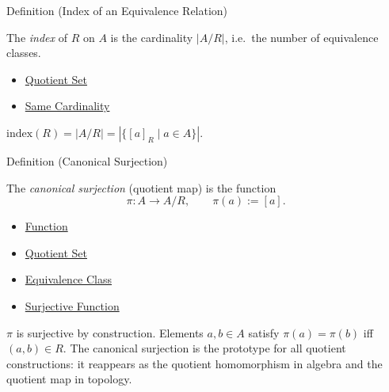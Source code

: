 \begin{definitionbox}{Definition (Index of an Equivalence Relation)}
\begin{definition}\label{def:index}
The \emph{index} of $R$ on $A$ is the cardinality $|A/R|$, i.e.\ the number
of equivalence classes.
\end{definition}
\end{definitionbox}

\begin{dependencies}
\begin{itemize}
  \item \hyperref[def:quotient-set]{Quotient Set}
  \item \hyperref[def:same-cardinality]{Same Cardinality}
\end{itemize}
\end{dependencies}

\begin{remark*}
$\mathrm{index}(R) = |A/R| = |\{[a]_R \mid a \in A\}|$.
\end{remark*}

\begin{definitionbox}{Definition (Canonical Surjection)}
\begin{definition}\label{def:canonical-surj}
The \emph{canonical surjection} (quotient map) is the function
\[
\pi : A \to A/R,
\qquad
\pi(a) := [a].
\]
\end{definition}
\end{definitionbox}

\begin{dependencies}
\begin{itemize}
  \item \hyperref[def:function]{Function}
  \item \hyperref[def:quotient-set]{Quotient Set}
  \item \hyperref[def:equiv-class]{Equivalence Class}
  \item \hyperref[def:surjective]{Surjective Function}
\end{itemize}
\end{dependencies}

\begin{remark*}[Properties of $\pi$]
$\pi$ is surjective by construction. Elements $a, b \in A$ satisfy
$\pi(a) = \pi(b)$ iff $(a,b) \in R$. The canonical surjection is the
prototype for all quotient constructions: it reappears as the quotient
homomorphism in algebra and the quotient map in topology.
\end{remark*}

